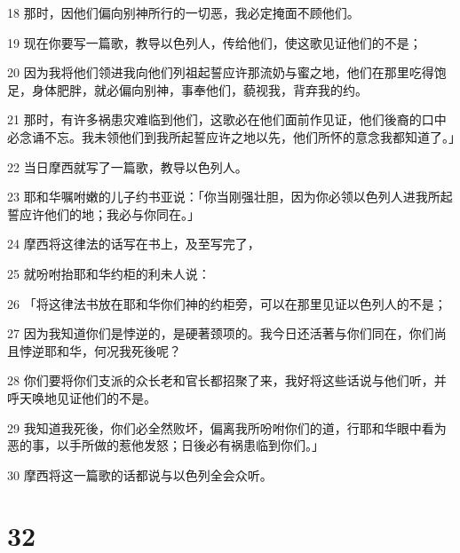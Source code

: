 \par 18 那时，因他们偏向别神所行的一切恶，我必定掩面不顾他们。
\par 19 现在你要写一篇歌，教导以色列人，传给他们，使这歌见证他们的不是；
\par 20 因为我将他们领进我向他们列祖起誓应许那流奶与蜜之地，他们在那里吃得饱足，身体肥胖，就必偏向别神，事奉他们，藐视我，背弃我的约。
\par 21 那时，有许多祸患灾难临到他们，这歌必在他们面前作见证，他们後裔的口中必念诵不忘。我未领他们到我所起誓应许之地以先，他们所怀的意念我都知道了。」
\par 22 当日摩西就写了一篇歌，教导以色列人。
\par 23 耶和华嘱咐嫩的儿子约书亚说：「你当刚强壮胆，因为你必领以色列人进我所起誓应许他们的地；我必与你同在。」
\par 24 摩西将这律法的话写在书上，及至写完了，
\par 25 就吩咐抬耶和华约柜的利未人说：
\par 26 「将这律法书放在耶和华你们神的约柜旁，可以在那里见证以色列人的不是；
\par 27 因为我知道你们是悖逆的，是硬著颈项的。我今日还活著与你们同在，你们尚且悖逆耶和华，何况我死後呢？
\par 28 你们要将你们支派的众长老和官长都招聚了来，我好将这些话说与他们听，并呼天唤地见证他们的不是。
\par 29 我知道我死後，你们必全然败坏，偏离我所吩咐你们的道，行耶和华眼中看为恶的事，以手所做的惹他发怒；日後必有祸患临到你们。」
\par 30 摩西将这一篇歌的话都说与以色列全会众听。

\chapter{32}

